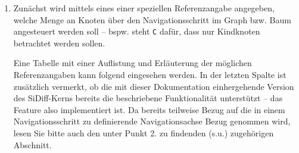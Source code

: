 \begin{enumerate}
	\item Zunächst wird mittels eines einer speziellen Referenzangabe angegeben, welche Menge an Knoten über den Navigationsschritt im Graph bzw. Baum angesteuert werden soll -- bspw. steht \texttt{C} dafür, dass nur Kindknoten betrachtet werden sollen.
	
	Eine Tabelle mit einer Auflistung und Erläuterung der möglichen Referenzangaben kann folgend eingesehen werden. In der letzten Spalte ist zusätzlich vermerkt, ob die mit dieser Dokumentation einhergehende Version des SiDiff-Kerns bereits die beschriebene Funktionalität unterstützt -- das Feature also implementiert ist. Da bereits teilweise Bezug auf die in einem Navigationsschritt zu definierende Navigationsachse Bezug genommen wird, lesen Sie bitte auch den unter Punkt 2. zu findenden (s.u.) zugehörigen Abschnitt.
	
	\vfill\newpage
	

\end{enumerate}
